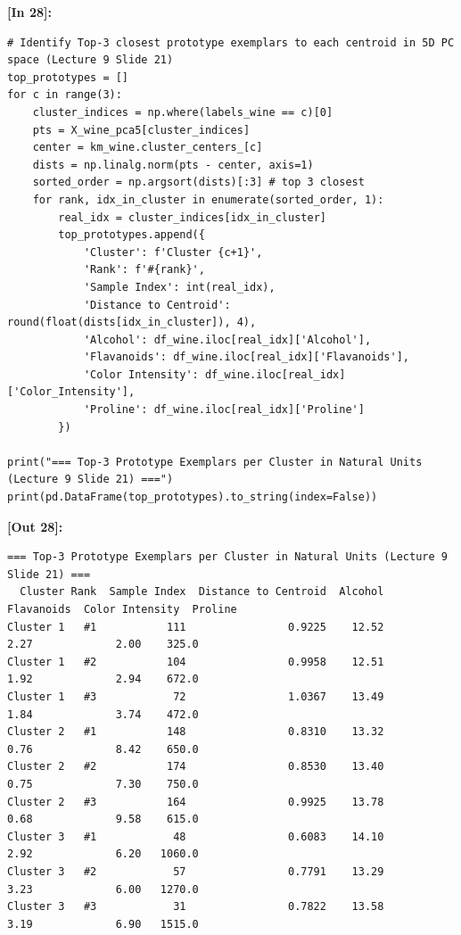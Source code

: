 \vspace{0.4em}
\noindent\textbf{\small [In 28]:}
\begin{lstlisting}[style=pycode]
# Identify Top-3 closest prototype exemplars to each centroid in 5D PC space (Lecture 9 Slide 21)
top_prototypes = []
for c in range(3):
    cluster_indices = np.where(labels_wine == c)[0]
    pts = X_wine_pca5[cluster_indices]
    center = km_wine.cluster_centers_[c]
    dists = np.linalg.norm(pts - center, axis=1)
    sorted_order = np.argsort(dists)[:3] # top 3 closest
    for rank, idx_in_cluster in enumerate(sorted_order, 1):
        real_idx = cluster_indices[idx_in_cluster]
        top_prototypes.append({
            'Cluster': f'Cluster {c+1}',
            'Rank': f'#{rank}',
            'Sample Index': int(real_idx),
            'Distance to Centroid': round(float(dists[idx_in_cluster]), 4),
            'Alcohol': df_wine.iloc[real_idx]['Alcohol'],
            'Flavanoids': df_wine.iloc[real_idx]['Flavanoids'],
            'Color Intensity': df_wine.iloc[real_idx]['Color_Intensity'],
            'Proline': df_wine.iloc[real_idx]['Proline']
        })

print("=== Top-3 Prototype Exemplars per Cluster in Natural Units (Lecture 9 Slide 21) ===")
print(pd.DataFrame(top_prototypes).to_string(index=False))
\end{lstlisting}
\noindent\textbf{\small [Out 28]:}
\begin{lstlisting}[style=output]
=== Top-3 Prototype Exemplars per Cluster in Natural Units (Lecture 9 Slide 21) ===
  Cluster Rank  Sample Index  Distance to Centroid  Alcohol  Flavanoids  Color Intensity  Proline
Cluster 1   #1           111                0.9225    12.52        2.27             2.00    325.0
Cluster 1   #2           104                0.9958    12.51        1.92             2.94    672.0
Cluster 1   #3            72                1.0367    13.49        1.84             3.74    472.0
Cluster 2   #1           148                0.8310    13.32        0.76             8.42    650.0
Cluster 2   #2           174                0.8530    13.40        0.75             7.30    750.0
Cluster 2   #3           164                0.9925    13.78        0.68             9.58    615.0
Cluster 3   #1            48                0.6083    14.10        2.92             6.20   1060.0
Cluster 3   #2            57                0.7791    13.29        3.23             6.00   1270.0
Cluster 3   #3            31                0.7822    13.58        3.19             6.90   1515.0
\end{lstlisting}

